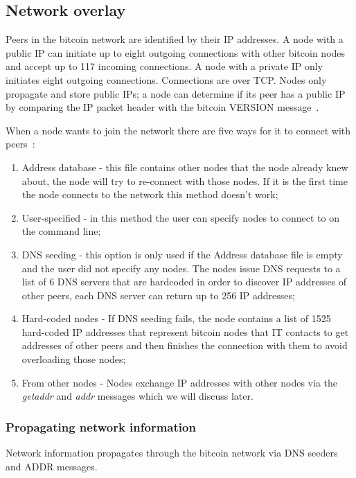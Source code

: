 \subsection{Network overlay}
\label{sec:p2pnetwork}

Peers in the bitcoin network are identified by their IP addresses. A node with a public IP can initiate up to eight outgoing connections with other bitcoin nodes and accept up to 117 incoming connections. A node with a private IP only initiates eight outgoing connections. Connections are over TCP. Nodes only propagate and store public IPs; a node can determine if its peer has a public IP by comparing the IP packet header with the bitcoin VERSION message~\cite{heilman2015eclipse}.

When a node wants to join the network there are five ways for it to connect with peers~\cite{bitcoinwiki}:

\begin{enumerate}
	\item Address database - this file contains other nodes that the node already knew about, the node will try to re-connect with those nodes. If it is the first time the node connects to the network this method doesn't work;
	\item User-specified - in this method the user can specify nodes to connect to on the command line;
	\item DNS seeding - this option is only used if the Address database file is empty and the user did not specify any nodes. The nodes issue DNS requests to a list of 6 DNS servers that are hardcoded in order to discover IP addresses of other peers, each DNS server can return up to 256 IP addresses;
	\item Hard-coded nodes - If DNS seeding fails, the node contains a list of 1525 hard-coded IP addresses that represent bitcoin nodes that IT contacts to get addresses of other peers and then finishes the connection with them to avoid overloading those nodes;
	\item From other nodes - Nodes exchange IP addresses with other nodes via the \textit{getaddr} and \textit{addr} messages which we will discuss later.
\end{enumerate}

\subsubsection*{Propagating network information}

Network information propagates through the bitcoin network via DNS seeders and ADDR messages.
